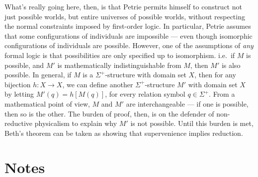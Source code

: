 \begin{example}
  What's really going here, then, is that Petrie permits himself to
  construct not just possible worlds, but entire universes of possible
  worlds, without respecting the normal constraints imposed by
  first-order logic.  In particular, Petrie assumes that some
  configurations of individuals are impossible --- even though
  isomorphic configurations of individuals are possible.  However, one
  of the assumptions of {\it any} formal logic is that possibilities
  are only specified up to isomorphism. i.e.\ if $M$ is possible, and
  $M'$ is mathematically indistinguishable from $M$, then $M'$ is also
  possible.  In general, if $M$ is a $\Sigma ^+$-structure with domain
  set $X$, then for any bijection $h:X\to X$, we can define another
  $\Sigma ^+$-structure $M'$ with domain set $X$ by letting
  $M'(q)=h[M(q)]$, for every relation symbol $q\in \Sigma ^+$.  From a
  mathematical point of view, $M$ and $M'$ are interchangeable --- if
  one is possible, then so is the other.  The burden of proof, then,
  is on the defender of non-reductive physicalism to explain why $M'$
  is not possible.  Until this burden is met, Beth's theorem can be
  taken as showing that supervenience implies reduction.
\end{example}



\section{Notes}

